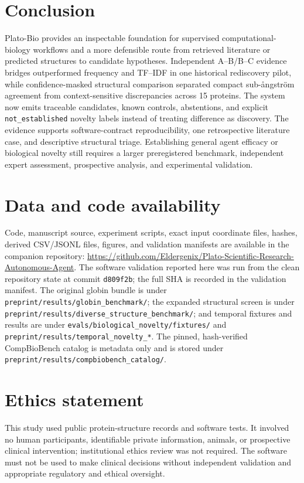 \documentclass[11pt]{article}
\begin{document}
\section{Conclusion}

Plato-Bio provides an inspectable foundation for supervised computational-biology workflows and a more defensible route from retrieved literature or predicted structures to candidate hypotheses. Independent A--B/B--C evidence bridges outperformed frequency and TF--IDF in one historical rediscovery pilot, while confidence-masked structural comparison separated compact sub-ångström agreement from context-sensitive discrepancies across 15 proteins. The system now emits traceable candidates, known controls, abstentions, and explicit \nolinkurl{not_established} novelty labels instead of treating difference as discovery. The evidence supports software-contract reproducibility, one retrospective literature case, and descriptive structural triage. Establishing general agent efficacy or biological novelty still requires a larger preregistered benchmark, independent expert assessment, prospective analysis, and experimental validation.

\section{Data and code availability}

Code, manuscript source, experiment scripts, exact input coordinate files, hashes, derived CSV/JSONL files, figures, and validation manifests are available in the companion repository: \url{https://github.com/Eldergenix/Plato-Scientific-Research-Autonomous-Agent}. The software validation reported here was run from the clean repository state at commit \nolinkurl{d809f2b}; the full SHA is recorded in the validation manifest. The original globin bundle is under \nolinkurl{preprint/results/globin_benchmark/}; the expanded structural screen is under \nolinkurl{preprint/results/diverse_structure_benchmark/}; and temporal fixtures and results are under \nolinkurl{evals/biological_novelty/fixtures/} and \nolinkurl{preprint/results/temporal_novelty_*}. The pinned, hash-verified CompBioBench catalog is metadata only and is stored under \nolinkurl{preprint/results/compbiobench_catalog/}.

\section{Ethics statement}

This study used public protein-structure records and software tests. It involved no human participants, identifiable private information, animals, or prospective clinical intervention; institutional ethics review was not required. The software must not be used to make clinical decisions without independent validation and appropriate regulatory and ethical oversight.
\end{document}
